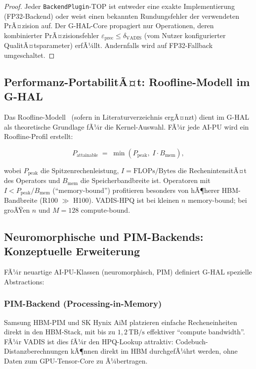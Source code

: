 ﻿\documentclass[12pt,a4paper]{article}
\begin{document}
\begin{proof}
Jeder \texttt{BackendPlugin}-TOP ist entweder eine exakte
Implementierung (FP32-Backend) oder weist einen bekannten
Rundungsfehler der verwendeten PrÃ¤zision auf.
Der G-HAL-Core propagiert nur Operationen, deren kombinierter
PrÃ¤zisionsfehler $\varepsilon_{\text{prec}} \leq \delta_{\text{VADIS}}$
(vom Nutzer konfigurierter QualitÃ¤tsparameter) erfÃ¼llt.
Andernfalls wird auf FP32-Fallback umgeschaltet.
\end{proof}

\subsection{Performanz-PortabilitÃ¤t: Roofline-Modell im G-HAL}
\label{sub:roofline}

Das Roofline-Modell~\cite{williams2009roofline} (sofern in
Literaturverzeichnis ergÃ¤nzt) dient im G-HAL als theoretische
Grundlage fÃ¼r die Kernel-Auswahl. FÃ¼r jede AI-PU wird ein
Roofline-Profil erstellt:

\begin{equation}
  P_{\text{attainable}} \;=\; \min\!\left(
    P_{\text{peak}},\;
    I \cdot B_{\text{mem}}
  \right),
\end{equation}

wobei $P_{\text{peak}}$ die Spitzenrechenleistung,
$I = \text{FLOPs}/\text{Bytes}$ die RechenintensitÃ¤t
des Operators und $B_{\text{mem}}$ die Speicherbandbreite ist.
Operatoren mit $I < P_{\text{peak}} / B_{\text{mem}}$
(``memory-bound'') profitieren besonders von hÃ¶herer HBM-Bandbreite
(R100 $\gg$ H100). VADIS-HPQ ist bei kleinen $n$ memory-bound;
bei groÃŸen $n$ und $M=128$ compute-bound.

\subsection{Neuromorphische und PIM-Backends: Konzeptuelle Erweiterung}
\label{sub:neuro_pim}

FÃ¼r neuartige AI-PU-Klassen (neuromorphisch, PIM) definiert
G-HAL spezielle Abstractions:

\subsubsection{PIM-Backend (Processing-in-Memory)}

Samsung HBM-PIM und SK Hynix AiM platzieren einfache
Recheneinheiten direkt in den HBM-Stack, mit bis zu
$1,2\,\text{TB/s}$ effektiver ``compute bandwidth''.
FÃ¼r VADIS ist dies fÃ¼r den HPQ-Lookup attraktiv:
Codebuch-Distanzberechnungen kÃ¶nnen direkt im HBM
durchgefÃ¼hrt werden, ohne Daten zum GPU-Tensor-Core zu Ã¼bertragen.
\end{document}
